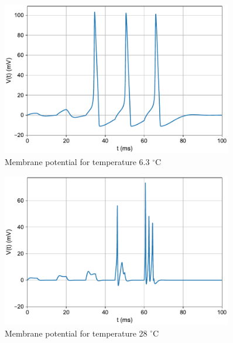 \documentclass{scrartcl}
\begin{document}
\newpage
\begin{figure}[h]
	\centering
	\includegraphics[width=0.9\textwidth]{figures/potential_temp6.3.pdf}
	\caption{Membrane potential for temperature 6.3 $^{\circ}$C}
	\label{fig:potential_temp6_3}
\end{figure}
\begin{figure}[h!]
	\centering
	\includegraphics[width=0.9\textwidth]{figures/potential_temp28.pdf}
	\caption{Membrane potential for temperature 28 $^{\circ}$C}
	\label{fig:potential_temp28}
\end{figure}
\end{document}
